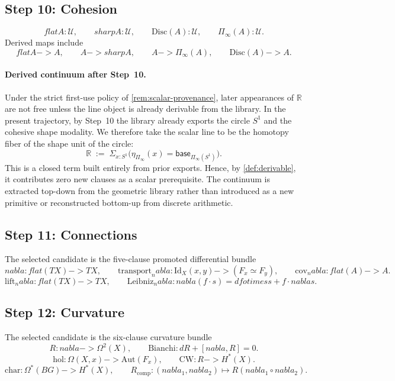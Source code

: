 \documentclass[11pt,a4paper]{article}
\def\to{->}%
\def\otimes{otimes}%
\def\nabla{nabla}%
\def\flat{flat}%
\def\sharp{sharp}%
\theoremstyle{plain}
\theoremstyle{definition}
\theoremstyle{remark}
\newcommand{\R}{\mathbb{R}}
\newcommand{\U}{\mathcal{U}}
\newcommand{\Shape}{\Pi_{\!\infty}}
\newcommand{\Disc}{\mathrm{Disc}}
\begin{document}
\subsection{Step 10: Cohesion}

\[
  \flat A:\U,\qquad
  \sharp A:\U,\qquad
  \Disc(A):\U,\qquad
  \Shape(A):\U.
\]
Derived maps include
\[
  \flat A\to A,
  \qquad
  A\to \sharp A,
  \qquad
  A\to \Shape(A),
  \qquad
  \Disc(A)\to A.
\]

\paragraph{Derived continuum after Step~10.}
Under the strict first-use policy of \cref{rem:scalar-provenance}, later appearances of $\R$ are not free unless the line object is already derivable from the library.  In the present trajectory, by Step~10 the library already exports the circle $S^1$ and the cohesive shape modality.  We therefore take the scalar line to be the homotopy fiber of the shape unit of the circle:
\[
  \R \;:=\; \Sigma_{x:S^1}\bigl(\eta_{\Shape}(x)=\mathsf{base}_{\Shape(S^1)}\bigr).
\]
This is a closed term built entirely from prior exports.  Hence, by \cref{def:derivable}, it contributes zero new clauses as a scalar prerequisite.  The continuum is extracted top-down from the geometric library rather than introduced as a new primitive or reconstructed bottom-up from discrete arithmetic.

\subsection{Step 11: Connections}

The selected candidate is the five-clause promoted differential bundle
\[
  \nabla:\flat(TX)\to TX,
  \qquad
  \mathrm{transport}_\nabla:\mathrm{Id}_X(x,y)\to (F_x\simeq F_y),
  \qquad
  \mathrm{cov}_\nabla:\flat(A)\to A.
\]
\[
  \mathrm{lift}_\nabla:\flat(TX)\to TX,
  \qquad
  \mathrm{Leibniz}_\nabla:\nabla(f\cdot s)=df\otimes s + f\cdot \nabla s.
\]

\subsection{Step 12: Curvature}

The selected candidate is the six-clause curvature bundle
\[
  R:\nabla\to \Omega^2(X),
  \qquad
  \mathrm{Bianchi}:dR+[\nabla,R]=0.
\]
\[
  \mathrm{hol}:\Omega(X,x)\to \mathrm{Aut}(F_x),
  \qquad
  \mathrm{CW}:R\to H^*(X).
\]
\[
  \mathrm{char}:\Omega^*(BG)\to H^*(X),
  \qquad
  R_{\mathrm{comp}}:(\nabla_1,\nabla_2)\mapsto R(\nabla_1\circ\nabla_2).
\]
\end{document}
